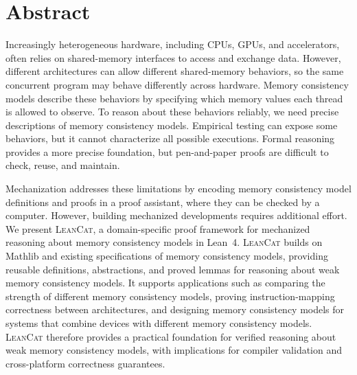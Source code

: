\chapter*{Abstract}

Increasingly heterogeneous hardware, including CPUs, GPUs, and accelerators, often relies on shared-memory interfaces to access and exchange data. However, different architectures can allow different shared-memory behaviors, so the same concurrent program may behave differently across hardware. Memory consistency models describe these behaviors by specifying which memory values each thread is allowed to observe. To reason about these behaviors reliably, we need precise descriptions of memory consistency models. Empirical testing can expose some behaviors, but it cannot characterize all possible executions. Formal reasoning provides a more precise foundation, but pen-and-paper proofs are difficult to check, reuse, and maintain.

Mechanization addresses these limitations by encoding memory consistency model definitions and proofs in a proof assistant, where they can be checked by a computer. However, building mechanized developments requires additional effort. We present \textsc{LeanCat}, a domain-specific proof framework for mechanized reasoning about memory consistency models in Lean~4. \textsc{LeanCat} builds on Mathlib and existing specifications of memory consistency models, providing reusable definitions, abstractions, and proved lemmas for reasoning about weak memory consistency models. It supports applications such as comparing the strength of different memory consistency models, proving instruction-mapping correctness between architectures, and designing memory consistency models for systems that combine devices with different memory consistency models. \textsc{LeanCat} therefore provides a practical foundation for verified reasoning about weak memory consistency models, with implications for compiler validation and cross-platform correctness guarantees.
